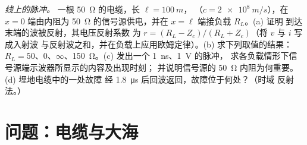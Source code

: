 \begin{exercise}[$\star\star\star$]\label{exo:b2:dispersion-wave-packets:12}
\emph{线上的脉冲。} 一根 \qty{50}{\ohm} 的电缆，长 $\ell = \qty{100}{m}$，
（$c = \qty{2e8}{m/s}$），在 $x = 0$ 端由内阻为
\qty{50}{\ohm} 的信号源供电，并在 $x = \ell$ 端接负载 $R_L$。(a) 证明
到达末端的波被反射，其电压反射系数
为 $r = (R_L - Z_c)/(R_L + Z_c)$（将 $v$ 与 $i$ 写成入射波
与反射波之和，并在负载上应用欧姆定律）。(b) 求下列取值的结果：
$R_L = 50$、$0$、$\infty$、\qty{150}{\ohm}。(c) 发出一个 \qty{1}{ns}、\qty{1}{V} 的脉冲，
求各负载情形下信号源端示波器所显示的内容及出现时刻；
并说明信号源的 \qty{50}{\ohm} 内阻为何重要。(d) 埋地电缆中的一处故障
经 \qty{1.8}{\micro s} 后回波返回，故障位于何处？（时域
反射法。）
\end{exercise}

\section{问题：电缆与大海}

